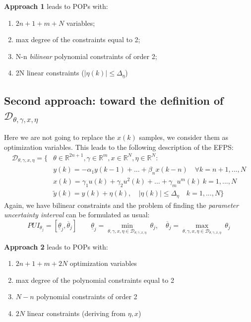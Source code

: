 \begin{remark}
    \textbf{Approach 1} leads to POPs with:
    \begin{enumerate}
        \itemsep-0.2em
        \item $2n+1+m+N$ variables; 
        \item max degree of the constraints equal to 2; 
        \item N-n \textit{bilinear} polynomial constraints of order 2; 
        \item 2N linear constraints (\small{$\vert \eta(k) \vert \le \Delta_\eta$})
    \end{enumerate}
\end{remark}

\subsection{Second approach: toward the definition of $\mathcal{D}_{\theta,\gamma,x,\eta}$}
Here we are not going to replace the $x(k)$ samples, we consider them as optimization variables. This leads to the following description of the EFPS:
\begin{equation}
    \begin{aligned}
        \mathcal{D}_{\theta,\gamma,x,\eta} = \big\{&
            \theta\in\mathbb{R}^{2n+1}, \gamma\in\mathbb{R}^m, x\in\mathbb{R}^N, \eta\in\mathbb{R}^N:\\
            &y(k)=-\alpha_1{y(k-1)+...+\beta_n{x(k-n)}} \quad \forall{k=n+1,...,N}\\
            & x(k)=\gamma_1{u(k)}+\gamma_2{u^2(k)}+...+\gamma_m{u^{m}(k)} \ k=1,...,N \\
            &\tilde{y}(k)=y(k)+\eta(k), \quad 
            \vert \eta(k) \vert \le \Delta_\eta \quad k=1,..., N
        \big\}
    \end{aligned}
\end{equation}
Again, we have bilinear constraints and the problem of finding the \textit{parameter uncertainty interval} can be formulated as usual: 
\begin{equation}
    PUI_{\theta_j} = [
        \underline{\theta}_j,
        \overline{\theta}_j
    ] \qquad  
    \underline{\theta}_j=\min_{\theta,\gamma,x,\eta\in{\mathcal{D}_{\theta,\gamma,x,\eta}}} \ {\theta_j}, \quad
    \overline{\theta}_j=\max_{\theta,\gamma,x,\eta\in{\mathcal{D}_{\theta,\gamma,x,\eta}}} \ {\theta_j} 
\end{equation}

\begin{remark}
    \textbf{Approach 2} leads to POPs with:
    \begin{enumerate}
        \itemsep-0.3em
        \item $2n+1+m+2N$ optimization variables
        \item max degree of the polynomial constraints equal to 2
        \item $N-n$ polynomial constraints of order 2
        \item $2N$ linear constraints (deriving from $\eta,x$)
    \end{enumerate}
\end{remark}

